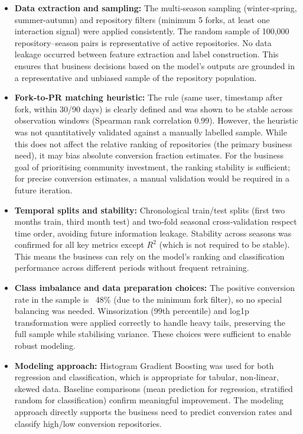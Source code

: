 \begin{itemize}
    \item \textbf{Data extraction and sampling:} The multi‑season sampling (winter‑spring, summer‑autumn) and repository filters (minimum 5 forks, at least one interaction signal) were applied consistently. The random sample of 100,000 repository–season pairs is representative of active repositories. No data leakage occurred between feature extraction and label construction. This ensures that business decisions based on the model’s outputs are grounded in a representative and unbiased sample of the repository population.

    \item \textbf{Fork‑to‑PR matching heuristic:} The rule (same user, timestamp after fork, within 30/90 days) is clearly defined and was shown to be stable across observation windows (Spearman rank correlation 0.99). However, the heuristic was not quantitatively validated against a manually labelled sample. While this does not affect the relative ranking of repositories (the primary business need), it may bias absolute conversion fraction estimates. For the business goal of prioritising community investment, the ranking stability is sufficient; for precise conversion estimates, a manual validation would be required in a future iteration.

    \item \textbf{Temporal splits and stability:} Chronological train/test splits (first two months train, third month test) and two‑fold seasonal cross‑validation respect time order, avoiding future information leakage. Stability across seasons was confirmed for all key metrics except $R^2$ (which is not required to be stable). This means the business can rely on the model’s ranking and classification performance across different periods without frequent retraining.

    \item \textbf{Class imbalance and data preparation choices:} The positive conversion rate in the sample is ~48\% (due to the minimum fork filter), so no special balancing was needed. Winsorization (99th percentile) and log1p transformation were applied correctly to handle heavy tails, preserving the full sample while stabilising variance. These choices were sufficient to enable robust modeling.

    \item \textbf{Modeling approach:} Histogram Gradient Boosting was used for both regression and classification, which is appropriate for tabular, non‑linear, skewed data. Baseline comparisons (mean prediction for regression, stratified random for classification) confirm meaningful improvement. The modeling approach directly supports the business need to predict conversion rates and classify high/low conversion repositories.


\end{itemize}
